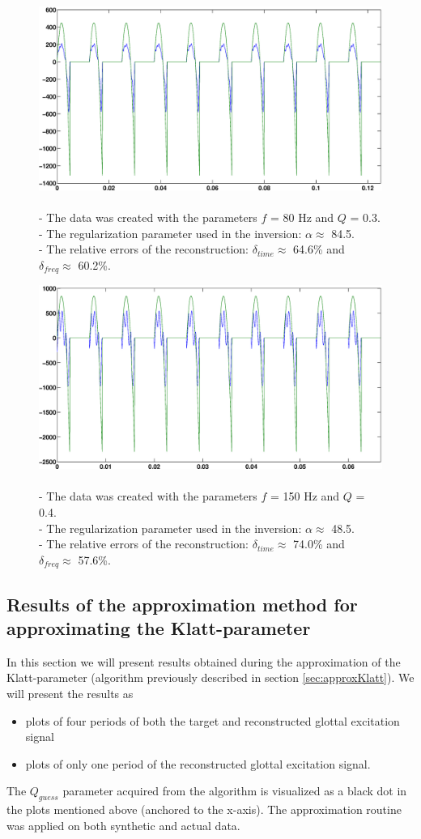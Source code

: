\documentclass[12pt,a4]{article}
\newcommand{\inversionresult}[5]{\\
 - The data was created with the parameters $f$ = #1 Hz and $Q$ = #2.\\
 - The regularization parameter used in the inversion: $\alpha \approx$ #3.\\
 - The relative errors of the reconstruction: $\delta_{time} \approx$ #4\% and $\delta_{freq} \approx$ #5\%.}
\begin{document}
\begin{figure}[H]
\begin{center}
\includegraphics[scale=.3]{img/morozov_no-crime_error-005_Qrand-0[Pres-V4].eps}
\end{center}
\caption{\inversionresult{80}{0.3}{84.5}{64.6}{60.2}}
\label{fig:tik-4}
\end{figure}
\begin{figure}[H]
\begin{center}
\includegraphics[scale=.3]{img/morozov_no-crime_error-005_Qrand-0[Pres-V2].eps}
\end{center}
\caption{\inversionresult{150}{0.4}{48.5}{74.0}{57.6}}
\label{fig:tik-5}
\end{figure}

\subsection{Results of the approximation method for \\approximating the Klatt-parameter}
\label{sec:KlattApprox}

In this section we will present results obtained during the approximation of the Klatt-parameter (algorithm previously described in section \ref{sec:approxKlatt}). We will present the results as
\begin{itemize}
 \item plots of four periods of both the target and reconstructed glottal excitation signal
 \item plots of only one period of the reconstructed glottal excitation signal.
\end{itemize}
The $Q_{guess}$ parameter acquired from the algorithm is visualized as a black dot in the plots mentioned above (anchored to the x-axis). The approximation routine was applied on both synthetic and actual data. \newpage
\end{document}
